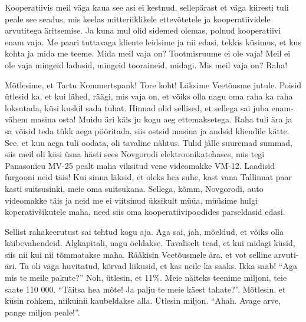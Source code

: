 
Kooperatiivis meil väga kaua see asi ei kestnud,  sellepärast et väga kiiresti tuli peale see seadus, mis keelas mitteriiklikele ettevõtetele ja kooperatiividele arvutitega äritsemise. Ja kuna mul olid sidemed olemas, polnud kooperatiivi enam vaja. Me paari tuttavaga kliente leidsime ja nii edasi, tekkis küsimus, et kus kohta ja mida me teeme. Mida meil vaja on? Tootmisruume ei ole vaja! Meil ei ole vaja mingeid ladusid, mingeid tooraineid, midagi. Mis meil vaja on? Raha!

Mõtlesime, et Tartu Kommertspank! Tore koht! Läksime Veetõusme jutule. Poisid ütlesid ka, et kui lähed, räägi, mis vaja on, et võiks olla nagu oma raha ka raha loksutada, küsi kuskil sada tuhat. Hinnad olid sellised, et sellega sai juba enam-vähem masina osta! Muidu äri käis ju kogu aeg ettemaksetega. Raha tuli ära ja sa võisid teda tükk aega pööritada, siis ostsid  masina ja andsid kliendile kätte. See, et kuu aega tuli oodata, oli tavaline nähtus. Tulid jälle suuremad summad, siis meil oli käsi üsna hästi sees Novgorodi elektroonikatehases, mis tegi  Panasonicu MV-25 pealt maha viksitud vene videomakke VM-12. Laadisid furgooni neid täis! Kui sinna läksid, et oleks hea suhe, kast vana Tallinnat paar kasti suitsusinki, meie oma suitsukana. Sellega, kõmm, Novgorodi, auto videomakke täis ja neid me ei viitsinud üksikult müüa, müüsime hulgi koperativšikutele maha, need siis oma kooperatiivipoodides parseldasid edasi. 

Sellist rahakeerutust sai tehtud kogu aja. Aga sai, jah, mõeldud, et võiks olla käibevahendeid. Algkapitali, nagu öeldakse. Tavaliselt tead, et kui  midagi küsid, siis nii kui nii tõmmatakse maha. Rääkisin Veetõusmele ära, et vot selline arvuti-äri. Ta oli väga huvitatud, kõrvad liikusid, et kas neile ka saaks. Ikka saab! \enquote{Aga mis te meile pakute?} Noh, ütlesin, et 11\%. Meie näiteks teenime miljoni, teie saate 110 000. \enquote{Täitsa hea mõte! Ja palju te meie käest tahate?}. Mõtlesin, et küsin rohkem, niikuinii kaubeldakse alla. Ütlesin miljon. \enquote{Ahah. Avage arve, pange miljon peale!}.

